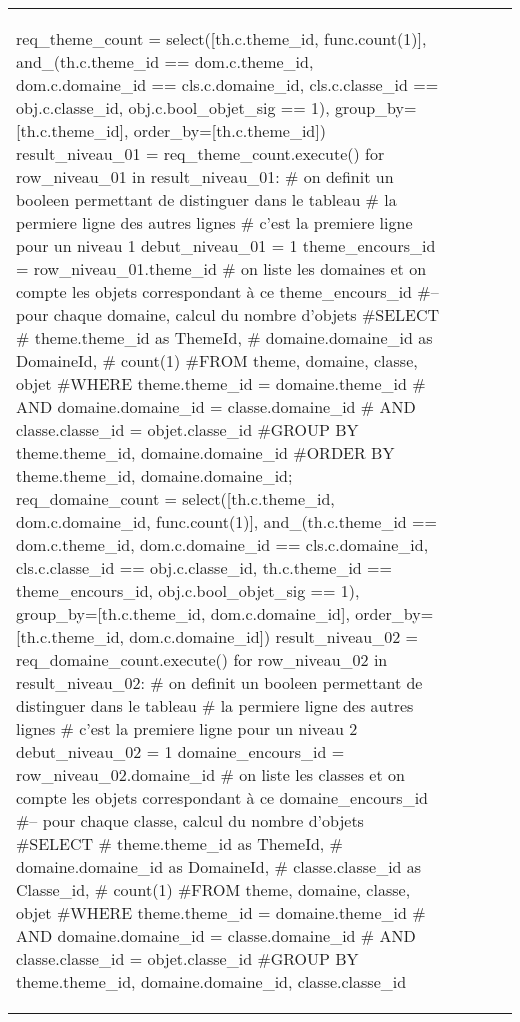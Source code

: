 \documentclass[12pt,titlepage,oneside]{book}
\begin{document}
\begin{supertabular}{|p{7.5cm}|p{7.5cm}|p{7.5cm}|c|p{10cm}|}
\begin{lbdpython}
req_theme_count = select([th.c.theme_id, func.count(1)],
                  and_(th.c.theme_id == dom.c.theme_id,
                       dom.c.domaine_id == cls.c.domaine_id,
                       cls.c.classe_id == obj.c.classe_id,
                       obj.c.bool_objet_sig == 1),
                  group_by=[th.c.theme_id],
                  order_by=[th.c.theme_id])
result_niveau_01 = req_theme_count.execute()
for row_niveau_01 in result_niveau_01:
   # on definit un booleen permettant de distinguer dans le tableau
   # la permiere ligne des autres lignes
   # c'est la premiere ligne pour un niveau 1
   debut_niveau_01 = 1
   theme_encours_id = row_niveau_01.theme_id
   # on liste les domaines et on compte les objets correspondant à ce theme_encours_id
   #-- pour chaque domaine, calcul du nombre d'objets
   #SELECT
   #   theme.theme_id as ThemeId,
   #   domaine.domaine_id as DomaineId,
   #   count(1)
   #FROM theme, domaine, classe, objet
   #WHERE theme.theme_id = domaine.theme_id
   #  AND domaine.domaine_id = classe.domaine_id
   #  AND classe.classe_id = objet.classe_id
   #GROUP BY theme.theme_id, domaine.domaine_id
   #ORDER BY theme.theme_id, domaine.domaine_id;
   req_domaine_count = select([th.c.theme_id, dom.c.domaine_id, func.count(1)],
                       and_(th.c.theme_id == dom.c.theme_id,
                            dom.c.domaine_id == cls.c.domaine_id,
                            cls.c.classe_id == obj.c.classe_id,
                            th.c.theme_id == theme_encours_id,
                            obj.c.bool_objet_sig == 1),
                       group_by=[th.c.theme_id, dom.c.domaine_id],
                       order_by=[th.c.theme_id, dom.c.domaine_id])
   result_niveau_02 = req_domaine_count.execute()
   for row_niveau_02 in result_niveau_02:
      # on definit un booleen permettant de distinguer dans le tableau
      # la permiere ligne des autres lignes
      # c'est la premiere ligne pour un niveau 2
      debut_niveau_02 = 1
      domaine_encours_id = row_niveau_02.domaine_id
      # on liste les classes et on compte les objets correspondant à ce domaine_encours_id
      #-- pour chaque classe, calcul du nombre d'objets
      #SELECT
      #   theme.theme_id as ThemeId,
      #   domaine.domaine_id as DomaineId,
      #   classe.classe_id as Classe_id,
      #   count(1)
      #FROM theme, domaine, classe, objet
      #WHERE theme.theme_id = domaine.theme_id 
      #  AND domaine.domaine_id = classe.domaine_id
      #  AND classe.classe_id = objet.classe_id
      #GROUP BY theme.theme_id, domaine.domaine_id, classe.classe_id

\end{lbdpython}
\end{supertabular}
\end{document}
